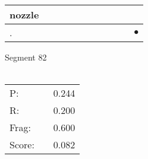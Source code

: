 \documentclass[landscape]{article}
\newcommand{\ssp}{\hspace{2pt}}
\newcommand{\mex}{\cellcolor{g}$\bullet$}
\begin{document}
\begin{tabular}{|l|p{10pt}|p{10pt}|p{10pt}|p{10pt}|p{10pt}|p{10pt}|p{10pt}|p{10pt}|p{10pt}|p{10pt}|}
\hline
\ssp nozzle \ssp&\hspace{2pt}&\hspace{2pt}&\hspace{2pt}&\hspace{2pt}&\hspace{2pt}&\hspace{2pt}&\hspace{2pt}&\hspace{2pt}&\hspace{2pt}&\hspace{2pt}\\
\hline
\ssp \cellcolor{ref9}. \ssp&\hspace{2pt}&\hspace{2pt}&\hspace{2pt}&\hspace{2pt}&\hspace{2pt}&\hspace{2pt}&\hspace{2pt}&\hspace{2pt}&\hspace{2pt}&\hspace{2pt}\mex\\
\hline
\end{tabular}

\vspace{6pt}
\noindent Segment 82\\\\
\noindent\begin{tabular}{lm{12pt}r}
\hline
P:&&0.244\\
R:&&0.200\\
Frag:&&0.600\\
Score:&&0.082\\
\end{tabular}

\newpage
\end{document}
